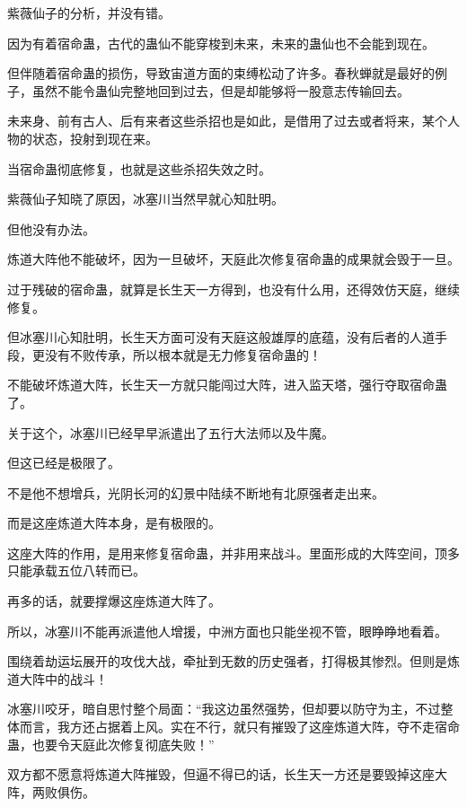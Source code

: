 
\begin{this_body}

紫薇仙子的分析，并没有错。

因为有着宿命蛊，古代的蛊仙不能穿梭到未来，未来的蛊仙也不会能到现在。

但伴随着宿命蛊的损伤，导致宙道方面的束缚松动了许多。春秋蝉就是最好的例子，虽然不能令蛊仙完整地回到过去，但是却能够将一股意志传输回去。

未来身、前有古人、后有来者这些杀招也是如此，是借用了过去或者将来，某个人物的状态，投射到现在来。

当宿命蛊彻底修复，也就是这些杀招失效之时。

紫薇仙子知晓了原因，冰塞川当然早就心知肚明。

但他没有办法。

炼道大阵他不能破坏，因为一旦破坏，天庭此次修复宿命蛊的成果就会毁于一旦。

过于残破的宿命蛊，就算是长生天一方得到，也没有什么用，还得效仿天庭，继续修复。

但冰塞川心知肚明，长生天方面可没有天庭这般雄厚的底蕴，没有后者的人道手段，更没有不败传承，所以根本就是无力修复宿命蛊的！

不能破坏炼道大阵，长生天一方就只能闯过大阵，进入监天塔，强行夺取宿命蛊了。

关于这个，冰塞川已经早早派遣出了五行大法师以及牛魔。

但这已经是极限了。

不是他不想增兵，光阴长河的幻景中陆续不断地有北原强者走出来。

而是这座炼道大阵本身，是有极限的。

这座大阵的作用，是用来修复宿命蛊，并非用来战斗。里面形成的大阵空间，顶多只能承载五位八转而已。

再多的话，就要撑爆这座炼道大阵了。

所以，冰塞川不能再派遣他人增援，中洲方面也只能坐视不管，眼睁睁地看着。

围绕着劫运坛展开的攻伐大战，牵扯到无数的历史强者，打得极其惨烈。但则是炼道大阵中的战斗！

冰塞川咬牙，暗自思忖整个局面：“我这边虽然强势，但却要以防守为主，不过整体而言，我方还占据着上风。实在不行，就只有摧毁了这座炼道大阵，夺不走宿命蛊，也要令天庭此次修复彻底失败！”

双方都不愿意将炼道大阵摧毁，但逼不得已的话，长生天一方还是要毁掉这座大阵，两败俱伤。


\end{this_body}
